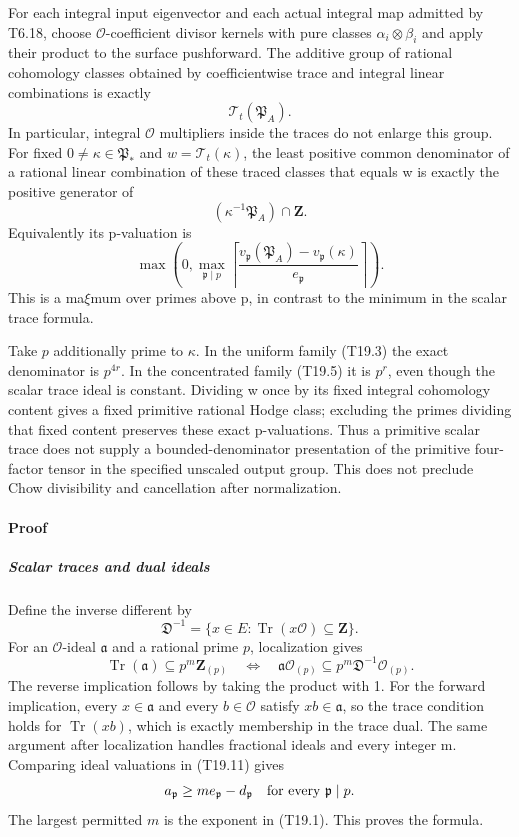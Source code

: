 \documentclass[11pt,a4paper]{article}
\theoremstyle{definition}
\begin{document}
For each integral input eigenvector and each actual integral map admitted by T6.18, choose \(\mathcal O\)-coefficient divisor kernels with pure classes \(\alpha_i\otimes\beta_i\) and apply their product to the surface pushforward. The additive group of rational cohomology classes obtained by coefficientwise trace and integral linear combinations is exactly \[
 \mathcal T_t(\mathfrak P_A).
 \tag{T19.8}
\] In particular, integral \(\mathcal O\) multipliers inside the traces do not enlarge this group. For fixed \(0\ne\kappa\in\mathfrak P_*\) and \(w=\mathcal T_t(\kappa)\), the least positive common denominator of a rational linear combination of these traced classes that equals w is exactly the positive generator of \[
 (\kappa^{-1}\mathfrak P_A)\cap\mathbf Z.
 \tag{T19.9}
\] Equivalently its p-valuation is \[
 \max\left(0,\max_{\mathfrak p\mid p}
     \left\lceil\frac{v_{\mathfrak p}(\mathfrak P_A)
                           -v_{\mathfrak p}(\kappa)}{e_{\mathfrak p}}\right\rceil\right).
 \tag{T19.10}
\] This is a ma\(\xi\)mum over primes above p, in contrast to the minimum in the scalar trace formula.

Take \(p\) additionally prime to \(\kappa\). In the uniform family (T19.3) the exact denominator is \(p^{4r}\). In the concentrated family (T19.5) it is \(p^r\), even though the scalar trace ideal is constant. Dividing w once by its fixed integral cohomology content gives a fixed primitive rational Hodge class; excluding the primes dividing that fixed content preserves these exact p-valuations. Thus a primitive scalar trace does not supply a bounded-denominator presentation of the primitive four-factor tensor in the specified unscaled output group. This does not preclude Chow divisibility and cancellation after normalization.

\paragraph{Proof}\label{rallis_t6_proofs-proof}

\subparagraph{Scalar traces and dual ideals}\label{scalar-traces-and-dual-ideals}

Define the inverse different by \[
 \mathfrak D^{-1}=\{x\in E:\operatorname{Tr}(x\mathcal O)\subseteq\mathbf Z\}.
\] For an \(\mathcal O\)-ideal \(\mathfrak a\) and a rational prime \(p\), localization gives \[
 \operatorname{Tr}(\mathfrak a)\subseteq p^m\mathbf Z_{(p)}
 \quad\Longleftrightarrow\quad
 \mathfrak a\mathcal O_{(p)}\subseteq p^m\mathfrak D^{-1}\mathcal O_{(p)}.
 \tag{T19.11}
\] The reverse implication follows by taking the product with 1. For the forward implication, every \(x\in\mathfrak a\) and every \(b\in\mathcal O\) satisfy \(xb\in\mathfrak a\), so the trace condition holds for \(\operatorname{Tr}(xb)\), which is exactly membership in the trace dual. The same argument after localization handles fractional ideals and every integer m. Comparing ideal valuations in (T19.11) gives \[
 a_{\mathfrak p}\ge me_{\mathfrak p}-d_{\mathfrak p}
 \quad\hbox{for every }\mathfrak p\mid p.
\] The largest permitted \(m\) is the exponent in (T19.1). This proves the formula.
\end{document}
